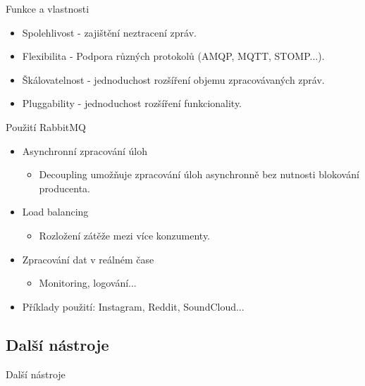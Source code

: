\documentclass{beamer}
\begin{document}
\begin{frame}{Funkce a vlastnosti}
	\begin{itemize}
		\item Spolehlivost - zajištění neztracení zpráv.
		\item Flexibilita - Podpora různých protokolů (AMQP, MQTT, STOMP...).
		\item Škálovatelnost - jednoduchost rozšíření objemu zpracovávaných zpráv.
		\item Pluggability - jednoduchost rozšíření funkcionality.
	\end{itemize}
\end{frame}

\begin{frame}{Použití RabbitMQ}
	\begin{itemize}
		\item Asynchronní zpracování úloh
		\begin{itemize}
			\item [\textendash] Decoupling umožňuje zpracování úloh asynchronně bez nutnosti blokování producenta.
		\end{itemize}
		\item Load balancing
		\begin{itemize}
			\item [\textendash] Rozložení zátěže mezi více konzumenty.
		\end{itemize}
		\item Zpracování dat v reálném čase
		\begin{itemize}
			\item [\textendash] Monitoring, logování...
		\end{itemize}
		\item Příklady použití: Instagram, Reddit, SoundCloud...
	\end{itemize}
\end{frame}

\subsection{Další nástroje}
\begin{frame}{Další nástroje}

\end{frame}
\end{document}
